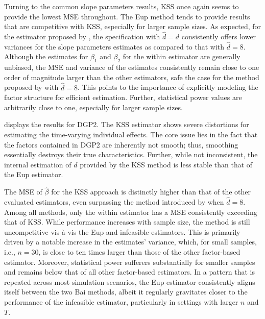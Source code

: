 Turning to the common slope parameters results, \ac{KSS} once again seems to provide the lowest \ac{MSE} throughout. The \ac{Eup} method tends to provide results that are competitive with \ac{KSS}, especially for larger sample sizes. As expected, for the estimator proposed by \citet{bai2009panel}, the specification with $\hat{d} = d$ consistently offers lower variances for the slope parameters estimates as compared to that with $\hat{d} = 8$. Although the estimates for $\beta_1$ and $\beta_2$ for the within estimator are generally unbiased, the \ac{MSE} and variance of the estimates consistently remain close to one order of magnitude larger than the other estimators, safe the case for the method proposed by \citet{bai2009panel} with $\hat{d} =8$. This points to the importance of explicitly modeling the factor structure for efficient estimation. Further, statistical power values are arbitrarily close to one, especially for larger sample sizes. 


  displays the results for \ac{DGP}2. The \ac{KSS} estimator shows severe distortions for estimating the time-varying individual effects. The core issue lies in the fact that the factors contained in \ac{DGP}2 are inherently not smooth; thus, smoothing essentially destroys their true characteristics. Further, while not inconsistent, the internal estimation of $d$ provided by the \ac{KSS} method is less stable than that of the \ac{Eup} estimator.
 
The \ac{MSE} of $\hat{\beta}$ for the \ac{KSS} approach is distinctly higher than that of the other evaluated estimators, even surpassing the method introduced by \citet{bai2009panel} when $\hat{d} =8$. Among all methods, only the within estimator has a \ac{MSE} consistently exceeding that of \ac{KSS}. While performance increases with sample size, the method is still uncompetitive vis-à-vis the \ac{Eup} and infeasible estimators. This is primarily driven by a notable increase in the estimates' variance, which, for small samples, i.e., $n = 30$, is close to ten times larger than those of the other factor-based estimator. Moreover, statistical power sufferers substantially for smaller samples and remains below that of all other factor-based estimators.  In a pattern that is repeated across most simulation scenarios, the \ac{Eup} estimator consistently aligns itself between the two Bai methods, albeit it regularly gravitates closer to the performance of the infeasible estimator, particularly in settings with larger \( n \) and \( T \). 





